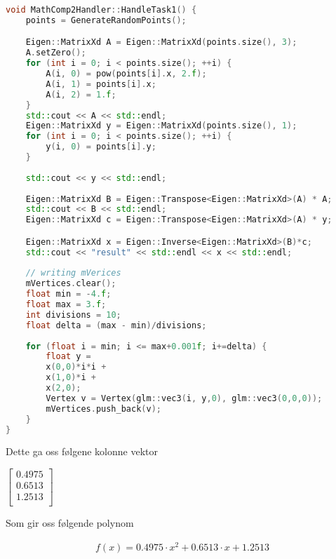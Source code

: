 ﻿\documentclass[14]{article}
\begin{document}
\begin{flushleft}
        
        
        \begin{lstlisting}[language=C++, caption=Funksjon som regner ut polynomet og lagrer numerisk grafdata]
void MathComp2Handler::HandleTask1() {
    points = GenerateRandomPoints();

    Eigen::MatrixXd A = Eigen::MatrixXd(points.size(), 3);
    A.setZero();
    for (int i = 0; i < points.size(); ++i) {
        A(i, 0) = pow(points[i].x, 2.f);
        A(i, 1) = points[i].x;
        A(i, 2) = 1.f;
    }
    std::cout << A << std::endl;
    Eigen::MatrixXd y = Eigen::MatrixXd(points.size(), 1);
    for (int i = 0; i < points.size(); ++i) {
        y(i, 0) = points[i].y;
    }
        
    std::cout << y << std::endl;
    
    Eigen::MatrixXd B = Eigen::Transpose<Eigen::MatrixXd>(A) * A;
    std::cout << B << std::endl;
    Eigen::MatrixXd c = Eigen::Transpose<Eigen::MatrixXd>(A) * y;

    Eigen::MatrixXd x = Eigen::Inverse<Eigen::MatrixXd>(B)*c;
    std::cout << "result" << std::endl << x << std::endl;
        
    // writing mVerices
    mVertices.clear();
    float min = -4.f;
    float max = 3.f;
    int divisions = 10;
    float delta = (max - min)/divisions;
        
    for (float i = min; i <= max+0.001f; i+=delta) {
        float y =
        x(0,0)*i*i +
        x(1,0)*i +
        x(2,0);
        Vertex v = Vertex(glm::vec3(i, y,0), glm::vec3(0,0,0));
        mVertices.push_back(v);    
    }
}
        \end{lstlisting}
        
        Dette ga oss følgene kolonne vektor
        \begin {center}
        $\begin{bmatrix}
            0.4975\\
            0.6513\\
            1.2513\\
        \end{bmatrix}$
        \end{center}
        
        Som gir oss følgende polynom
        
        \begin{align*}
            f(x) = 0.4975 \cdot  x^2 + 0.6513 \cdot x + 1.2513
        \end{align*}
        

\end{flushleft}
\end{document}
